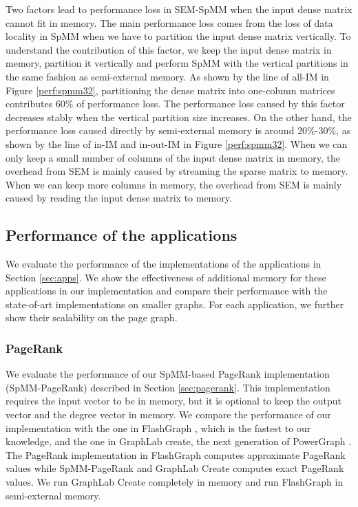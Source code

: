 Two factors lead to performance loss in SEM-SpMM when the input dense matrix
cannot fit in memory. The main performance loss comes from the loss of data
locality in SpMM when we have to partition the input dense matrix vertically.
To understand
the contribution of this factor, we keep the input dense matrix in memory,
partition it vertically and perform SpMM with the vertical partitions in
the same fashion as semi-external memory. As shown by the line of all-IM
in Figure \ref{perf:spmm32},
partitioning the dense matrix into one-column matrices contributes 60\%
of performance loss. The performance loss caused by this factor decreases
stably when the vertical partition size increases. On the other hand,
the performance loss caused directly by semi-external memory is around 20\%-30\%,
as shown by the line of in-IM and in-out-IM in Figure \ref{perf:spmm32}.
When we can only
keep a small number of columns of the input dense matrix in memory, the overhead
from SEM is mainly caused by streaming the sparse matrix to memory. When we can
keep more columns in memory, the overhead from SEM is mainly caused by reading
the input dense matrix to memory.

\subsection{Performance of the applications}

We evaluate the performance of the implementations of the applications in
Section \ref{sec:apps}. We show the effectiveness of additional memory for
these applications in our implementation and compare their performance
with the state-of-art implementations on smaller graphs. For each application,
we further show their scalability on the page graph.

\subsubsection{PageRank}
We evaluate the performance of our SpMM-based PageRank implementation
(SpMM-PageRank) described
in Section \ref{sec:pagerank}. This implementation requires the input vector
to be in memory, but it is optional to keep the output vector and the degree
vector in memory. We compare the performance of our implementation with
the one in FlashGraph \cite{flashgraph}, which is the fastest to our knowledge,
and the one in GraphLab create, the next generation of
PowerGraph \cite{powergraph}. The PageRank implementation in FlashGraph computes
approximate PageRank values while SpMM-PageRank and GraphLab Create computes
exact PageRank values. We run GraphLab Create completely in memory and run
FlashGraph in semi-external memory.

